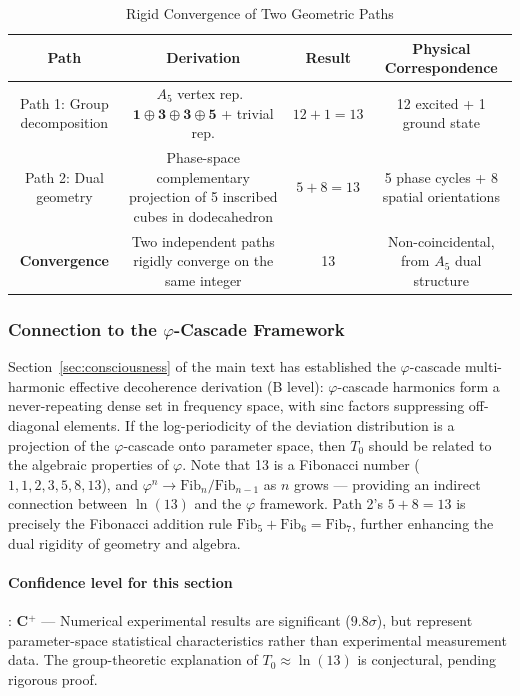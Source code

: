 \documentclass[12pt,a4paper,twocolumn]{article}
\renewcommand{\phi}{\varphi}
\begin{document}
\begin{table}[H]
\centering
\footnotesize
\caption{Rigid Convergence of Two Geometric Paths}
\label{tab:dual_paths_13}
\begin{tabular}{c|c|c|c}
\hline
\textbf{Path} & \textbf{Derivation} & \textbf{Result} & \textbf{Physical Correspondence} \\
\hline
Path 1: Group decomposition & $A_5$ vertex rep.\ $\mathbf{1}\oplus\mathbf{3}\oplus\mathbf{3}\oplus\mathbf{5}$ + trivial rep. & $12+1=13$ & 12 excited + 1 ground state \\
Path 2: Dual geometry & Phase-space complementary projection of 5 inscribed cubes in dodecahedron & $5+8=13$ & 5 phase cycles + 8 spatial orientations \\
\hline
\textbf{Convergence} & Two independent paths rigidly converge on the same integer & 13 & Non-coincidental, from $A_5$ dual structure \\
\hline
\end{tabular}
\end{table}

\subsubsection{Connection to the $\phi$-Cascade Framework}

Section~\ref{sec:consciousness} of the main text has established the $\phi$-cascade multi-harmonic effective decoherence derivation (B level): $\phi$-cascade harmonics form a never-repeating dense set in frequency space, with sinc factors suppressing off-diagonal elements. If the log-periodicity of the deviation distribution is a projection of the $\phi$-cascade onto parameter space, then $T_0$ should be related to the algebraic properties of $\phi$. Note that 13 is a Fibonacci number ($1,1,2,3,5,8,13$), and $\phi^n \to \text{Fib}_n/\text{Fib}_{n-1}$ as $n$ grows --- providing an indirect connection between $\ln(13)$ and the $\phi$ framework. Path 2's $5+8=13$ is precisely the Fibonacci addition rule $\text{Fib}_5+\text{Fib}_6=\text{Fib}_7$, further enhancing the dual rigidity of geometry and algebra.

\paragraph{Confidence level for this section}: \textbf{C$^+$} --- Numerical experimental results are significant ($9.8\sigma$), but represent parameter-space statistical characteristics rather than experimental measurement data. The group-theoretic explanation of $T_0 \approx \ln(13)$ is conjectural, pending rigorous proof.
\end{document}
